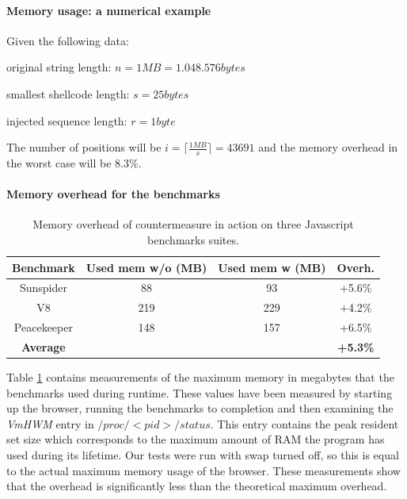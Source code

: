 \paragraph{Memory usage: a numerical example}

Given the following data:
\begin{description}
\item original string length:  $n = 1 MB = 1.048.576 bytes$ 
\item smallest shellcode length: $s = 25 bytes$ 
\item injected sequence length:  $r = 1  byte$ 
\end{description}

The number of positions will be $i= \lceil \frac{1MB}{s} \rceil= 43691$ and the memory overhead in the worst case will be $8.3\% $. 

\paragraph{Memory overhead for the benchmarks}
\begin{table}[htdp]
\begin{center}
\begin{tabular}{|c|c|c|c|}
\hline
\bf{Benchmark} & \bf{Used mem w/o (MB)} & \bf{Used mem w (MB)}  & \bf{Overh.} \\
\hline
Sunspider   &    88      &    93      &  +5.6\% \\
V8          &    219     &    229     &  +4.2\% \\
Peacekeeper &    148     &    157     &  +6.5\% \\
\hline
\bf{Average}  &   &   & \bf{+5.3\%} \\
\hline
\end{tabular}
\end{center}
\caption{{ Memory overhead of countermeasure in action on three Javascript benchmarks suites.}}
\label{memory}
\end{table}


Table \ref{memory} contains measurements of the maximum memory in megabytes that the benchmarks used during  runtime. These values have been measured by starting up the browser, running the benchmarks to completion and then examining the \emph{VmHWM} entry in $/proc/<pid>/status$.
This entry contains the peak resident set size which corresponds to the maximum amount of RAM the program has used during its lifetime. Our tests were run with swap turned off, so this is equal to the actual maximum memory usage of the browser. These measurements show that the overhead  is significantly less than the theoretical maximum overhead.

